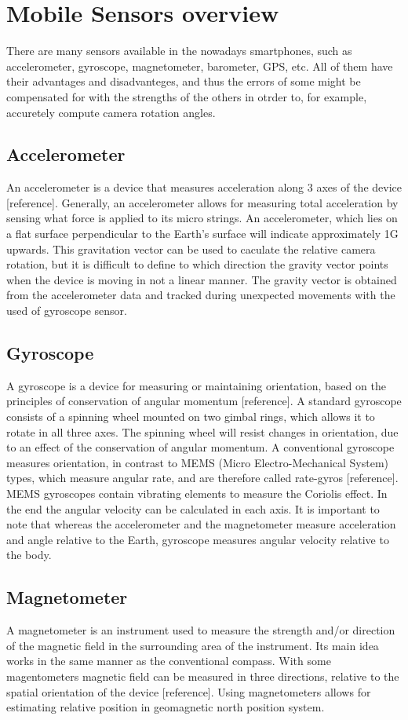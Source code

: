 \section{Mobile Sensors overview}
There are many sensors available in the nowadays smartphones, such as accelerometer, gyroscope, magnetometer, barometer, GPS, etc. All of them have their advantages and disadvanteges, and thus the errors of some might be compensated for with the strengths of the others in otrder to, for example, accuretely compute camera rotation angles.
\subsection{Accelerometer}
An accelerometer is a device that measures acceleration along 3 axes of the device [reference]. Generally, an accelerometer allows for measuring total acceleration by sensing what force is applied to its micro strings. An accelerometer, which lies on a flat surface perpendicular to the Earth's surface will indicate approximately 1G upwards. This gravitation vector can be used to caculate the relative camera rotation, but it is difficult to define to which direction the gravity vector points when the device is moving in not a linear manner. The gravity vector is obtained from the accelerometer data and tracked during unexpected movements with the used of gyroscope sensor.
\subsection{Gyroscope}
A gyroscope is a device for measuring or maintaining orientation, based on the principles of conservation of angular momentum [reference]. A standard gyroscope consists of a spinning wheel mounted on two gimbal rings, which allows it to rotate in all three axes. The spinning wheel will resist changes in orientation, due to an effect of the conservation of angular momentum. A conventional gyroscope measures orientation, in contrast to MEMS (Micro Electro-Mechanical System) types, which measure
angular rate, and are therefore called rate-gyros [reference]. MEMS gyroscopes contain vibrating elements to measure the Coriolis effect. In the end the angular velocity can be calculated in each axis. It is important to note that whereas the accelerometer and the magnetometer measure acceleration and angle relative to the Earth, gyroscope measures angular velocity
relative to the body.
\subsection{Magnetometer}
A magnetometer is an instrument used to measure the strength and/or direction of the magnetic field in the surrounding area of the instrument. Its main idea works in the same manner as the conventional compass. With some magentometers magnetic field can be measured in three directions, relative to the spatial orientation of the device [reference]. Using magnetometers allows for estimating relative position in geomagnetic north position system. 
